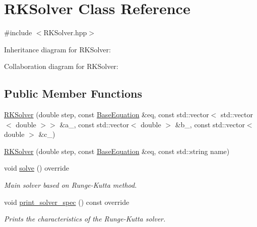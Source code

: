 \hypertarget{classRKSolver}{}\section{R\+K\+Solver Class Reference}
\label{classRKSolver}


{\ttfamily \#include $<$R\+K\+Solver.\+hpp$>$}



Inheritance diagram for R\+K\+Solver\+:


Collaboration diagram for R\+K\+Solver\+:
\subsection*{Public Member Functions}
\begin{DoxyCompactItemize}
\item 
\hyperlink{classRKSolver_a47393b170acf8f25fb5110448ba4981b}{R\+K\+Solver} (double step, const \hyperlink{classBaseEquation}{Base\+Equation} \&eq, const std\+::vector$<$ std\+::vector$<$ double $>$$>$ \&a\+\_\+, const std\+::vector$<$ double $>$ \&b\+\_\+, const std\+::vector$<$ double $>$ \&c\+\_\+)
\item 
\hyperlink{classRKSolver_aa1b51cd0bb2327b364d3a47f131d8bf0}{R\+K\+Solver} (double step, const \hyperlink{classBaseEquation}{Base\+Equation} \&eq, const std\+::string name)
\item 
void \hyperlink{classRKSolver_aa251eaaa56b4ef39d95347579b8a6259}{solve} () override
\begin{DoxyCompactList}\small\item\em Main solver based on Runge-\/\+Kutta method. \end{DoxyCompactList}\item 
void \hyperlink{classRKSolver_af7ec0ddafd838e03c9db344a2abd8674}{print\+\_\+solver\+\_\+spec} () const override
\begin{DoxyCompactList}\small\item\em Prints the characteristics of the Runge-\/\+Kutta solver. \end{DoxyCompactList}\end{DoxyCompactItemize}
